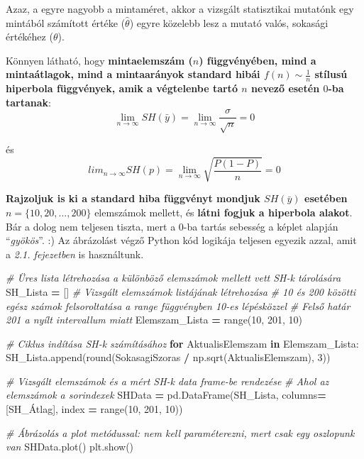 \documentclass[
]{book}
\newenvironment{Shaded}{\begin{snugshade}}{\end{snugshade}}
\newcommand{\BuiltInTok}[1]{#1}
\newcommand{\CommentTok}[1]{\textcolor[rgb]{0.56,0.35,0.01}{\textit{#1}}}
\newcommand{\ControlFlowTok}[1]{\textcolor[rgb]{0.13,0.29,0.53}{\textbf{#1}}}
\newcommand{\DecValTok}[1]{\textcolor[rgb]{0.00,0.00,0.81}{#1}}
\newcommand{\KeywordTok}[1]{\textcolor[rgb]{0.13,0.29,0.53}{\textbf{#1}}}
\newcommand{\NormalTok}[1]{#1}
\newcommand{\OperatorTok}[1]{\textcolor[rgb]{0.81,0.36,0.00}{\textbf{#1}}}
\newcommand{\StringTok}[1]{\textcolor[rgb]{0.31,0.60,0.02}{#1}}
\begin{document}
Azaz, a egyre nagyobb a mintaméret, akkor a vizsgált statisztikai mutatónk egy mintából számított értéke (\(\hat{\theta}\)) egyre közelebb lesz a mutató valós, sokasági értékéhez (\(\theta\)).

Könnyen látható, hogy \textbf{mintaelemszám (\(n\)) függvényében, mind a mintaátlagok, mind a mintaarányok standard hibái \(f(n) \sim \frac{1}{n}\) stílusú hiperbola függvények, amik a végtelenbe tartó \(n\) nevező esetén \(0\)-ba tartanak}:\[\lim_{n \rightarrow \infty}{SH(\bar{y})} = \lim_{n \rightarrow \infty}{\frac{\sigma}{\sqrt{n}}} = 0\]

és \[lim_{n \rightarrow \infty}{SH(p)} = \lim_{n \rightarrow \infty}{\sqrt{\frac{P(1-P)}{n}}} = 0\]

\textbf{Rajzoljuk is ki a standard hiba függvényt mondjuk \(SH(\bar{y})\) esetében} \(n=\{10,20,...,200\}\) elemszámok mellett, és \textbf{látni fogjuk a hiperbola alakot}. Bár a dolog nem teljesen tiszta, mert a \(0\)-ba tartás sebesség a képlet alapján ``\emph{gyökös}''. :) Az ábrázolást végző Python kód logikája teljesen egyezik azzal, amit a \emph{2.1. fejezetben} is használtunk.

\begin{Shaded}
\begin{Highlighting}[]
\CommentTok{\# Üres lista létrehozása a különböző elemszámok mellett vett SH{-}k tárolására}
\NormalTok{SH\_Lista }\OperatorTok{=}\NormalTok{ []}
\CommentTok{\# Vizsgált elemszámok listájának létrehozása}
\CommentTok{\# 10 és 200 közötti egész számok felsoroltatása a \textquotesingle{}range\textquotesingle{} függvényben 10{-}es lépésközzel}
\CommentTok{\# Felső határ 201 a nyílt intervallum miatt}
\NormalTok{Elemszam\_Lista }\OperatorTok{=} \BuiltInTok{range}\NormalTok{(}\DecValTok{10}\NormalTok{, }\DecValTok{201}\NormalTok{, }\DecValTok{10}\NormalTok{)}

\CommentTok{\# Ciklus indítása SH{-}k számításához}
\ControlFlowTok{for}\NormalTok{ AktualisElemszam }\KeywordTok{in}\NormalTok{ Elemszam\_Lista:}
\NormalTok{  SH\_Lista.append(}\BuiltInTok{round}\NormalTok{(SokasagiSzoras }\OperatorTok{/}\NormalTok{ np.sqrt(AktualisElemszam), }\DecValTok{3}\NormalTok{))}

\CommentTok{\# Vizsgált elemszámok és a mért SH{-}k data frame{-}be rendezése}
\CommentTok{\# Ahol az elemszámok a sorindexek}
\NormalTok{SHData }\OperatorTok{=}\NormalTok{ pd.DataFrame(SH\_Lista, columns}\OperatorTok{=}\NormalTok{[}\StringTok{\textquotesingle{}SH\_Átlag\textquotesingle{}}\NormalTok{], index }\OperatorTok{=} \BuiltInTok{range}\NormalTok{(}\DecValTok{10}\NormalTok{, }\DecValTok{201}\NormalTok{, }\DecValTok{10}\NormalTok{))}

\CommentTok{\# Ábrázolás a \textquotesingle{}plot\textquotesingle{} metódussal: nem kell paraméterezni, mert csak egy oszlopunk van}
\NormalTok{SHData.plot()}
\NormalTok{plt.show()}
\end{Highlighting}
\end{Shaded}
\end{document}
